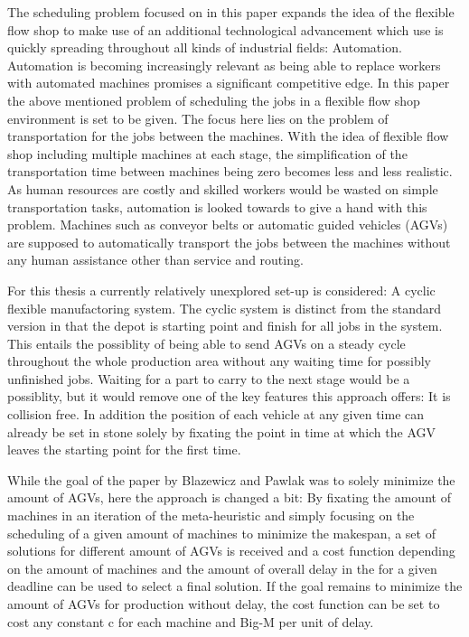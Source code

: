 The scheduling problem focused on in this paper expands
the idea of the flexible flow shop to make use of an additional technological advancement which use is quickly spreading throughout all kinds of
industrial fields: Automation. Automation is becoming increasingly relevant as being able to replace workers with automated machines promises a
significant competitive edge. In this paper the above mentioned problem of scheduling the jobs in a flexible flow shop environment is set to be
given. The focus here lies on the problem of transportation for the jobs between the machines. With the idea of flexible flow shop including multiple
machines at each stage, the simplification of the transportation time between machines being zero becomes less and less realistic. As human resources
are costly and skilled workers would be wasted on simple transportation tasks, automation is looked towards to give a hand with this problem.
Machines such as conveyor belts or automatic guided vehicles (AGVs) are supposed to automatically transport the jobs between the machines without
any human assistance other than service and routing. 

For this thesis a currently relatively unexplored set-up is considered: A cyclic flexible manufactoring system. The cyclic system is
distinct from the standard version in that the depot is starting point and finish for all jobs in the system. This entails the possiblity of
being able to send AGVs on a steady cycle throughout the whole production area without any waiting time for possibly unfinished jobs. Waiting
for a part to carry to the next stage would be a possiblity, but it would remove one of the key features this approach offers: It is collision
free. In addition the position of each vehicle at any given time can already be set in stone solely by fixating the point in time at which the
AGV leaves the starting point for the first time. 



While the goal of the paper by Blazewicz and Pawlak was to solely minimize the amount of AGVs, here the approach is changed a bit:
By fixating the amount of machines in an iteration of the meta-heuristic and simply focusing on the scheduling of a given
amount of machines to minimize the makespan, a set of solutions for different amount of AGVs is received and a cost function depending
on the amount of machines and the amount of overall delay in the for a given deadline can be used to select a final
solution. If the goal remains to minimize the amount of AGVs for production without delay, the cost function can be set
to cost any constant c for each machine and Big-M per unit of delay.







